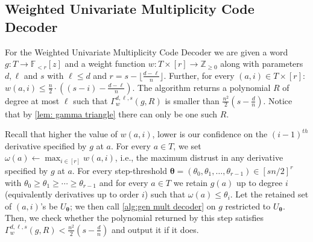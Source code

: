 \documentclass{theoretics}
\def\Integer{\mathbb{Z}}
\def\Field{\mathbb{F}}
\let\Z\Integer
\let\F\Field
\newcommand{\thetabar}{{\boldsymbol{\theta}}}
\begin{document}
	
	
	
	\subsection{Weighted Univariate Multiplicity Code Decoder}
	
	For the Weighted Univariate Multiplicity Code Decoder we are given a word $g\colon T \to \F_{<r}[z]$ and a weight function $w\colon T\times [r]\to \Z_{\geq 0}$ along with parameters $d,\ell$ and $s$ with $\ell \leq d$ and $r = s - \lfloor \frac{d-\ell}{n} \rfloor $. Further, for every $(a, i) \in T \times [r]$: $w(a,i) \leq \frac{n}{2}\cdot\left((s-i) - \frac{d-\ell}n\right)$.
	The algorithm returns a polynomial $R$ of degree at most $\ell$ such
	that $\Gamma_w^{d, \ell, s}(g, R) $ is smaller than
	$\frac{n^2}{2}(s-\frac{d}{n})$. Notice that by \cref{lem: gamma
		triangle} there can only be one such $R$. 
	
	Recall that higher the value of $w(a,i)$, lower is our confidence on the $(i-1)^{th}$ derivative specified by $g$ at $a$. 
	For every $a\in T$, we set  $ \omega(a) \gets \max_{i \in [r]} w(a, i)$, i.e., the maximum distrust in any derivative specified by $g$ at $a$.
	For every step-threshold $\thetabar = (\theta_0, \theta_1, \ldots,
	\theta_{r-1}) \in [sn/2]^r$ with $\theta_0 \geq \theta_1 \geq \dotsb
	\geq \theta_{r-1}$ and for every $a\in T$  we retain $g(a)$ up to
	degree $i$ (equivalently derivatives up to order $i$) such that
	$\omega(a)\leq \theta_i$. Let the retained set of $(a,i)$'s be
	$U_{\thetabar}$; we then call \cref{alg:gen mult decoder} on $g$
	restricted to $U_{\thetabar}$. Then, we check whether the polynomial
	returned by this  step satisfies $\Gamma_w^{d, \ell, s}(g, R) < \frac{n^2}{2}(s-\frac{d}{n})$ and output it if it does.\\
	
\end{document}
